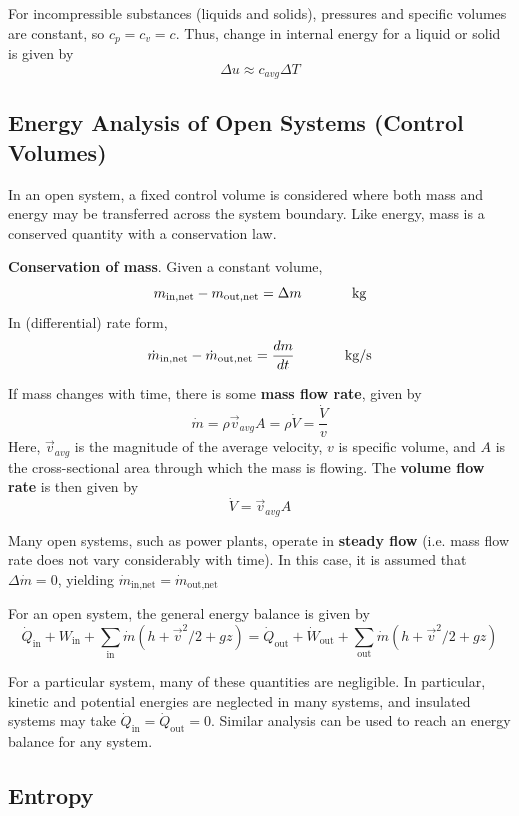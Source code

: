 For incompressible substances (liquids and solids), pressures and specific volumes are constant, so $c_p = c_v = c$. Thus, change in internal energy for a liquid or solid is given by \[\Delta u \approx c_{avg}\Delta T\]

\subsection{Energy Analysis of Open Systems (Control Volumes)}

In an open system, a fixed control volume is considered where both mass and energy may be transferred across the system boundary. Like energy, mass is a conserved quantity with a conservation law. 
\begin{shaded}
    \textbf{Conservation of mass}. Given a constant volume, \[m_\text{in,net} - m_\text{out,net} = \Delta m\hspace{0.5in}\text{kg}\] In (differential) rate form, \[\dot m_\text{in,net} - \dot m_\text{out,net} = \frac{dm}{dt}\hspace{0.5in}\text{kg}/\text{s}\]
\end{shaded}

If mass changes with time, there is some \textbf{mass flow rate}, given by \[\dot m = \rho \vec{v}_{avg} A = \rho\dot V = \frac{\dot V}{v}\] Here, $\vec{v}_{avg}$ is the magnitude of the average velocity, $v$ is specific volume, and $A$ is the cross-sectional area through which the mass is flowing. The \textbf{volume flow rate} is then given by \[\dot V = \vec{v}_{avg} A\]

Many open systems, such as power plants, operate in \textbf{steady flow} (i.e. mass flow rate does not vary considerably with time). In this case, it is assumed that $\Delta \dot m=0$, yielding $\dot m_{\text{in,net}} = \dot m_\text{out,net}$

For an open system, the general energy balance is given by \[\dot Q_\text{in} + W_\text{in} + \sum_\text{in} \dot m(h +\vec{v}^2/2 + gz) = \dot Q_\text{out} + \dot W_\text{out} + \sum_\text{out}\dot m(h + \vec{v}^2/2 + gz)\]

For a particular system, many of these quantities are negligible. In particular, kinetic and potential energies are neglected in many systems, and insulated systems may take $\dot Q_\text{in} = \dot Q_\text{out} = 0$. Similar analysis can be used to reach an energy balance for any system.

\subsection{Entropy}

